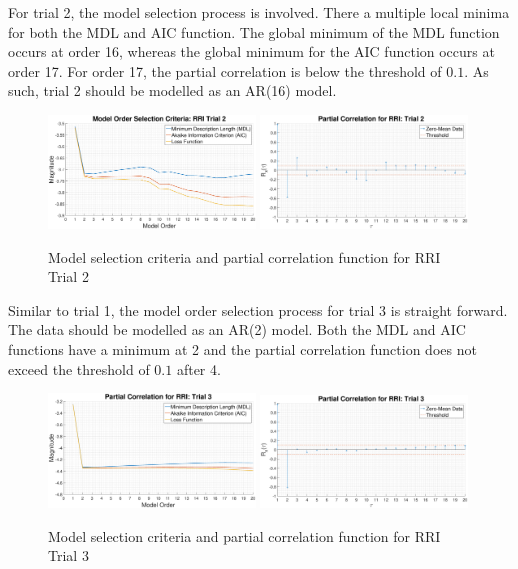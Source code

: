 \documentclass{article}
\begin{document}
For trial 2, the model selection process is involved. There a multiple local minima for both the MDL and AIC function. The global minimum of the MDL function occurs at order 16, whereas the global minimum for the AIC function occurs at order 17. For order 17, the partial correlation is below the threshold of $0.1$. As such, trial 2 should be modelled as an AR(16) model. 

\begin{figure}[H]
    \centering
    \includegraphics[width = 0.49\textwidth]{MLD_AIC_loss_rri_2}
    \includegraphics[width = 0.49\textwidth]{par_corr_rri_2}
    \caption{Model selection criteria and partial correlation function for RRI Trial 2}
    \label{fig:model_selection_rri_2}
\end{figure}

\newpage
Similar to trial 1, the model order selection process for trial 3 is straight forward. The data should be modelled as an AR(2) model. Both the MDL and AIC functions have a minimum at 2 and the partial correlation function does not exceed the threshold of $0.1$ after 4.

\begin{figure}[H]
    \centering
    \includegraphics[width = 0.49\textwidth]{MLD_AIC_loss_rri_3}
    \includegraphics[width = 0.49\textwidth]{par_corr_rri_3}
    \caption{Model selection criteria and partial correlation function for RRI Trial 3}
    \label{fig:model_selection_rri_3}
\end{figure}
\end{document}
